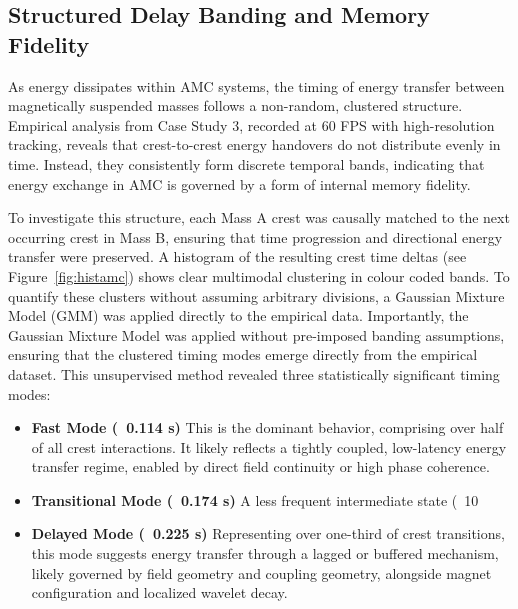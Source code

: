 \documentclass[10pt,aps,pre,onecolumn,superscriptaddress,notitlepage]{revtex4-2}
\begin{document}
\subsection{Structured Delay Banding and Memory Fidelity}
\label{sec:StructuredDelayBandingandMemoryFidelity}
As energy dissipates within AMC systems, the timing of energy transfer between magnetically suspended masses follows a non-random, clustered structure. Empirical analysis from Case Study 3, recorded at 60 FPS with high-resolution tracking, reveals that crest-to-crest energy handovers do not distribute evenly in time. Instead, they consistently form discrete temporal bands, indicating that energy exchange in AMC is governed by a form of internal memory fidelity.


To investigate this structure, each Mass A crest was causally matched to the next occurring crest in Mass B, ensuring that time progression and directional energy transfer were preserved. 
A histogram of the resulting crest time deltas (see Figure~\ref{fig:histamc}) shows clear multimodal clustering in colour coded bands.
To quantify these clusters without assuming arbitrary divisions, a Gaussian Mixture Model (GMM) was applied directly to the empirical data. Importantly, the Gaussian Mixture Model was applied without pre-imposed banding assumptions, ensuring that the clustered timing modes emerge directly from the empirical dataset. This unsupervised method revealed three statistically significant timing modes:

\begin{itemize}
    \item \textbf{Fast Mode (~0.114 s)}
 This is the dominant behavior, comprising over half of all crest interactions. It likely reflects a tightly coupled, low-latency energy transfer regime, enabled by direct field continuity or high phase coherence.


    \item \textbf{Transitional Mode (~0.174 s)}
 A less frequent intermediate state (~10%


    \item \textbf{Delayed Mode (~0.225 s)}
 Representing over one-third of crest transitions, this mode suggests energy transfer through a lagged or buffered mechanism, likely governed by field geometry and coupling geometry, alongside magnet configuration and localized wavelet decay.
\end{itemize}
\end{document}

